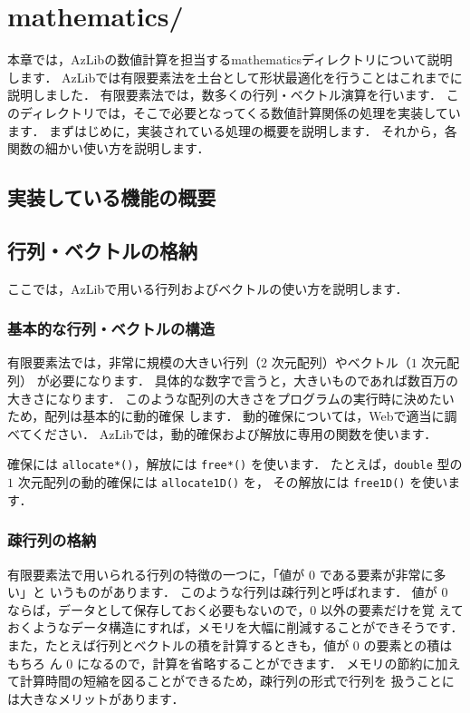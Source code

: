 \chapter{mathematics/} \label{chap:mathematics}

本章では，AzLibの数値計算を担当するmathematicsディレクトリについて説明します．
AzLibでは有限要素法を土台として形状最適化を行うことはこれまでに説明しました．
有限要素法では，数多くの行列・ベクトル演算を行います．
このディレクトリでは，そこで必要となってくる数値計算関係の処理を実装しています．
まずはじめに，実装されている処理の概要を説明します．
それから，各関数の細かい使い方を説明します．

\section{実装している機能の概要}

\section{行列・ベクトルの格納}

ここでは，AzLibで用いる行列およびベクトルの使い方を説明します．

\subsection{基本的な行列・ベクトルの構造}
有限要素法では，非常に規模の大きい行列（$2$ 次元配列）やベクトル（$1$ 次元配列）
が必要になります．
具体的な数字で言うと，大きいものであれば数百万の大きさになります．
このような配列の大きさをプログラムの実行時に決めたいため，配列は基本的に動的確保
します．
動的確保については，Webで適当に調べてください．
AzLibでは，動的確保および解放に専用の関数を使います．

確保には \verb|allocate*()|，解放には \verb|free*()| を使います．
たとえば，\verb|double| 型の $1$ 次元配列の動的確保には \verb|allocate1D()| を，
その解放には \verb|free1D()| を使います．


\subsection{疎行列の格納}
有限要素法で用いられる行列の特徴の一つに，「値が $0$ である要素が非常に多い」と
いうものがあります．
このような行列は疎行列と呼ばれます．
値が $0$ ならば，データとして保存しておく必要もないので，$0$ 以外の要素だけを覚
えておくようなデータ構造にすれば，メモリを大幅に削減することができそうです．
また，たとえば行列とベクトルの積を計算するときも，値が $0$ の要素との積はもちろ
ん $0$ になるので，計算を省略することができます．
メモリの節約に加えて計算時間の短縮を図ることができるため，疎行列の形式で行列を
扱うことには大きなメリットがあります．

